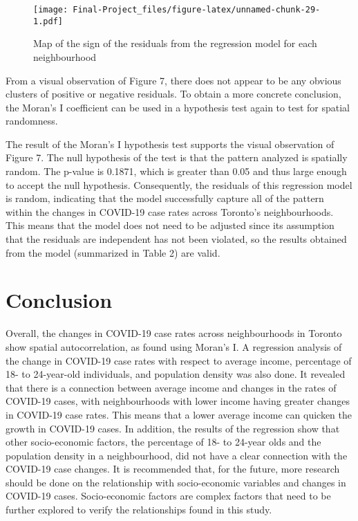 \documentclass[]{article}
\begin{document}
\begin{figure}
\centering
\texttt{[image: Final-Project\_files/figure-latex/unnamed-chunk-29-1.pdf]}
\caption{Map of the sign of the residuals from the regression model for
each neighbourhood}
\end{figure}

From a visual observation of Figure 7, there does not appear to be any
obvious clusters of positive or negative residuals. To obtain a more
concrete conclusion, the Moran's I coefficient can be used in a
hypothesis test again to test for spatial randomness.

The result of the Moran's I hypothesis test supports the visual
observation of Figure 7. The null hypothesis of the test is that the
pattern analyzed is spatially random. The p-value is 0.1871, which is
greater than 0.05 and thus large enough to accept the null hypothesis.
Consequently, the residuals of this regression model is random,
indicating that the model successfully capture all of the pattern within
the changes in COVID-19 case rates across Toronto's neighbourhoods. This
means that the model does not need to be adjusted since its assumption
that the residuals are independent has not been violated, so the results
obtained from the model (summarized in Table 2) are valid.

\hypertarget{conclusion}{%
\section{Conclusion}\label{conclusion}}

Overall, the changes in COVID-19 case rates across neighbourhoods in
Toronto show spatial autocorrelation, as found using Moran's I. A
regression analysis of the change in COVID-19 case rates with respect to
average income, percentage of 18- to 24-year-old individuals, and
population density was also done. It revealed that there is a connection
between average income and changes in the rates of COVID-19 cases, with
neighbourhoods with lower income having greater changes in COVID-19 case
rates. This means that a lower average income can quicken the growth in
COVID-19 cases. In addition, the results of the regression show that
other socio-economic factors, the percentage of 18- to 24-year olds and
the population density in a neighbourhood, did not have a clear
connection with the COVID-19 case changes. It is recommended that, for
the future, more research should be done on the relationship with
socio-economic variables and changes in COVID-19 cases. Socio-economic
factors are complex factors that need to be further explored to verify
the relationships found in this study.
\end{document}
